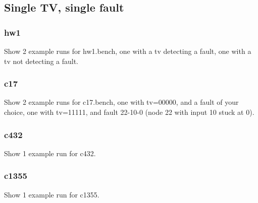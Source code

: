\documentclass{article}
\begin{document}
            \subsection{Single TV, single fault}
                \subsubsection{hw1}
                Show 2 example runs for hw1.bench, one with a tv detecting a fault, one with a tv not detecting a fault.
                
                \subsubsection{c17}
                Show 2 example runs for c17.bench, one with tv=00000, and a fault of your choice, one with tv=11111, and fault 22-10-0 (node 22 with input 10 stuck at 0).

                \subsubsection{c432}
                Show 1 example run for c432.

                \subsubsection{c1355}
                Show 1 example run for c1355.

\end{document}
